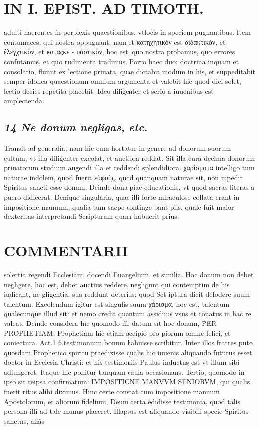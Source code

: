 \documentclass{article}
\begin{document}
\begin{pages}
\section*{IN I. EPIST. AD TIMOTH. }
\marginpar{[ p.111 ]}\pstart adulti haerentes in perplexis quaestionibus, vtlocis in speciem pugnantibus. Item contumaces, qui nostra oppugnant: nam et κατηχητικόν est διδακτικόν, et ἐλεγχτικὸν, et καταςκε - υαστικὸν, hoc est, quo nostra probamus, quo errores confutamus, et quo rudimenta tradimus. Porro haec duo: doctrina inquam et consolatio, fluunt ex lectione priuata, quae dictabit modum in his, et suppeditabit semper idonea quaestionum omnium argumenta et valebit hic quod dici solet, lectio decies repetita placebit. Ideo diligenter et serio a iuuenibus est amplectenda.  \pend
{}
{}
\subsection*{\textit{14  Ne donum negligas, etc. }}\pstart Transit ad generalia, nam hic eum hortatur in genere ad donorum suorum cultum, vt illa diligenter excolat, et auctiora reddat. Sit illa cura decima donorum priuatorum studium augendi illa et reddendi splendidiora. χαρίσματα intelligo tum naturae indolem, quod fuerit εὐφυὴς, quod quanquam naturae sit, non mpedit Spiritus sancti esse donum.  \pend\pstart Deinde dona piae educationis, vt quod sacras literas a puero didicerat. Denique singularia, quae illi forte miraculose collata erant in impositione manuum, qualia tum saepe continge bant piis, quale fuit maior dexteritas interpretandi Scripturam quam habuerit prius:  \pend
\section*{COMMENTARII }
\marginpar{[ p.112 ]}\pstart solertia regendi Ecclesiam, docendi Euangelium, et similia. Hoc donum non debet neghgere, hoc est, debet auctius reddere, negligunt qui contemptim de his iudicant, ne gligentia. sua reddunt deterius: quod Sct iptura dicit defodere suum talentum. Excolendum igitur est singulis suum χάρισμα, hoc est, talentum qualecunque illud sit: et nemo credit quantum assiduus vsus et conatus in hac re valeat.  \pend\pstart Deinde considera hic quomodo illi datum sit hoc donum, PER PROPHETIAM. Prophetiam hic etiam accipio pro piorum omine felici, et coniectura. Act.1 6.testimonium bonum habuisse scribitur. Inter illos fratres puto quosdam Prophetico spiritu praedixisse qualis hic iuuenis aliquando futurus esset doctor in Ecclesia Christi: et his testimoniis Paulus inductus est vt illum sibi adiungeret. Itaque hic ponitur tanquam caula occasionans.  \pend\pstart Tertio, quomodo in ipso sit reipsa confirmatum: IMPOSITIONE MANVVM SENIORVM, qui qualis fuerit ritus alibi diximus. Hinc certe constat cum impositione manuum Apostolorum, et aliorum fidelium, Deum certa edidisse testimonia, quod talis persona illi ad tale munus placeret. Illapsus est aliquando visibili specie Spiritus sanctns, aliâs  \pend

\end{pages}
\end{document}
